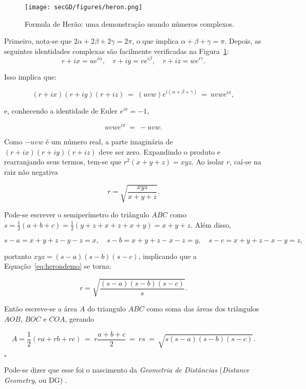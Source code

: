 \begin{figure}[H]
	\begin{center}
		\texttt{[image: secGD/figures/heron.png]}
	\end{center}
	\caption{Formula de Herão: uma demonstração usando números complexos. \cite{libertiSixGemsDGHistory}}
	\label{fig:heron}
\end{figure}

Primeiro, nota-se que $2\alpha + 2\beta + 2\gamma = 2\pi$, o que implica $\alpha + \beta + \gamma = \pi$. Depois, as seguintes identidades complexas são facilmente verificadas na Figura~\ref{fig:heron}:
$$ r+ix = ue^{i\alpha}, \quad r+iy = ve^{i\beta}, \quad r+iz = we^{i\gamma}.$$

Isso implica que:

$$(r+ix)(r+iy)(r+iz) \ =\ (uvw)e^{i(\alpha+\beta+\gamma)} \ =\ uvwe^{i\pi},$$

e, conhecendo a identidade de Euler $e^{i\pi} = -1$, 

$$uvwe^{i\pi} \ =\ -uvw.$$

Como $-uvw$ é um número real, a parte imaginária de $(r+ix)(r+iy)(r+iz)$ deve ser zero. Expandindo o produto e rearranjando seus termos, tem-se que $r^2(x+y+z) = xyz$. Ao isolar $r$, caí-se na raiz não negativa

\begin{equation}
	r = \sqrt{\frac{xyz}{x+y+z}}.
\label{eq:herondemo}
\end{equation}

Pode-se escrever o semiperímetro do triângulo $ABC$ como $s=\frac{1}{2}(a+b+c)=\frac{1}{2}(y+z+x+z+x+y) = x+y+z$. Além disso,

$$s-a=x+y+z-y-z=x, \quad s-b = x+y+z-x-z = y, \quad s-c = x+y+z-x-y=z,$$

portanto $xyz = (s-a)(s-b)(s-c)$, implicando que a Equação~\ref{eq:herondemo} se torna:

$$r = \sqrt{\frac{(s-a)(s-b)(s-c)}{s}}.$$

Então escreve-se a área $A$ do triangulo $ABC$ como soma das áreas dos triângulos $AOB$, $BOC$ e $COA$, gerando

$$A = \frac{1}{2}(ra + rb+ rc) \ =\ r\frac{a+b+c}{2} \ =\ rs \ =\ \sqrt{s(s-a)(s-b)(s-c)}.$$
\begin{flushright}
	$\square$
\end{flushright}

Pode-se dizer que esse foi o nascimento da \textit{Geometria de Distâncias} (\textit{Distance Geometry}, ou DG) \cite{libertiSixGemsDGHistory}.
\\

